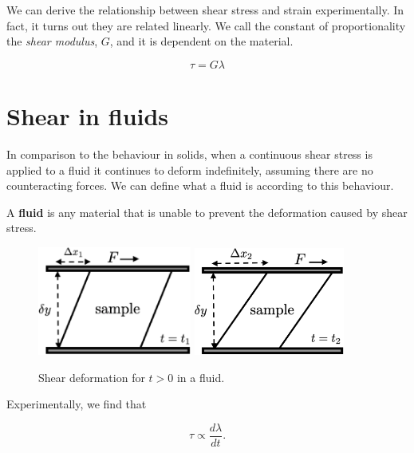 We can derive the relationship between shear stress and strain experimentally. In fact, it turns out they are related linearly. We call the constant of proportionality the \textit{shear modulus}, $G$, and it is dependent on the material.

\begin{equation} \label{eq:shear-in-solids}
  \tau = G \lambda
\end{equation}


\section{Shear in fluids}

In comparison to the behaviour in solids, when a continuous shear stress is applied to a fluid it continues to deform indefinitely, assuming there are no counteracting forces. We can define what a fluid is according to this behaviour.

\begin{definition}
  A \textbf{fluid} is any material that is unable to prevent the deformation caused by shear stress.
\end{definition}

\begin{figure}[h] \label{fig:shear-fluid}
  \centering
  \includegraphics[width=5.05cm]{fig/shear-fluid-t1.png}
  \includegraphics[width=4.95cm]{fig/shear-fluid-t2.png}
  \caption{Shear deformation for $t>0$ in a fluid.}
\end{figure}

Experimentally, we find that

\begin{equation}
  \tau \propto \frac{ d \lambda }{ d t }.
\end{equation}

